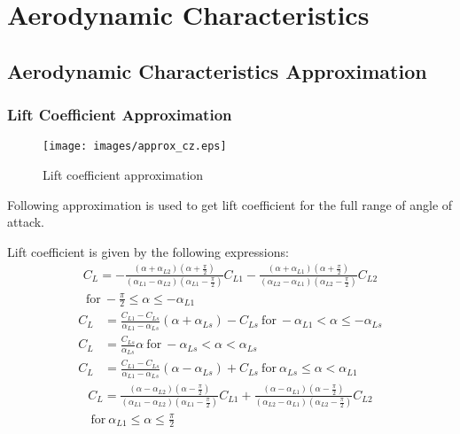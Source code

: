 \chapter{Aerodynamic Characteristics}

\section{Aerodynamic Characteristics Approximation}

\subsection{Lift Coefficient Approximation}

\begin{figure}[h!]
  \centering
  \texttt{[image: images/approx\_cz.eps]}
  \caption{Lift coefficient approximation}
\end{figure}

Following approximation is used to get lift coefficient for the full range of angle of attack. \cite{NASA-TM-102267}

Lift coefficient is given by the following expressions:
\begin{multline}
  C_L =
  -
  \frac{
    \left( \alpha + \alpha_{L2} \right)
    \left( \alpha + \frac{\pi}{2} \right) 
  }
  {
    \left( \alpha_{L1} - \alpha_{L2} \right)
    \left( \alpha_{L1} - \frac{\pi}{2} \right) 
  } C_{L1}
  -
  \frac{
    \left( \alpha + \alpha_{L1} \right)
    \left( \alpha + \frac{\pi}{2} \right)
  }
  {
    \left( \alpha_{L2} - \alpha_{L1} \right)
    \left( \alpha_{L2} - \frac{\pi}{2} \right)
  } C_{L2} \\
  \mathrm{~for~} -\frac{\pi}{2} \leq \alpha \leq - \alpha_{L1}
\end{multline}
\begin{align}
  C_L &=
  \frac{ C_{L1} - C_{Ls} }{ \alpha_{L1} - \alpha_{Ls} }
  \left( \alpha + \alpha_{Ls} \right) - C_{Ls}
  \mathrm{~for~} - \alpha_{L1} < \alpha \leq - \alpha_{Ls} \\
  C_L &= \frac{C_{Ls}}{\alpha_{Ls}} \alpha
  \mathrm{~for~} - \alpha_{Ls} < \alpha < \alpha_{Ls} \\
  C_L &=
  \frac{ C_{L1} - C_{Ls} }{ \alpha_{L1} - \alpha_{Ls} }
  \left( \alpha - \alpha_{Ls} \right) + C_{Ls}
  \mathrm{~for~} \alpha_{Ls} \leq \alpha < \alpha_{L1}
\end{align}
\begin{multline}
  C_L =
  \frac{
    \left( \alpha - \alpha_{L2} \right)
    \left( \alpha - \frac{\pi}{2} \right) 
  }
  {
    \left( \alpha_{L1} - \alpha_{L2} \right)
    \left( \alpha_{L1} - \frac{\pi}{2} \right) 
  } C_{L1}
  +
  \frac{
    \left( \alpha - \alpha_{L1} \right)
    \left( \alpha - \frac{\pi}{2} \right)
  }
  {
    \left( \alpha_{L2} - \alpha_{L1} \right)
    \left( \alpha_{L2} - \frac{\pi}{2} \right)
  } C_{L2} \\
  \mathrm{~for~} \alpha_{L1} \leq \alpha \leq \frac{\pi}{2}
\end{multline}

